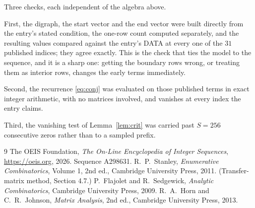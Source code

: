 \documentclass[11pt,a4paper]{article}
\theoremstyle{plain}
\theoremstyle{definition}
\begin{document}
Three checks, each independent of the algebra above.

First, the digraph, the start vector and the end vector were built directly from the
entry's stated condition, the one-row count computed separately, and the resulting values
compared against the entry's DATA at every one of the $31$ published indices; they
agree exactly. This is the check that ties the model to the sequence, and it is a sharp one:
getting the boundary rows wrong, or treating them as interior rows, changes the early terms
immediately.

Second, the recurrence \eqref{eq:conj} was evaluated on those published terms in exact
integer arithmetic, with no matrices involved, and vanishes at every index the entry claims.

Third, the vanishing test of Lemma~\ref{lem:crit} was carried past $S=256$ consecutive
zeros rather than to a sampled prefix.

\begin{thebibliography}{9}
 The OEIS Foundation, \emph{The On-Line Encyclopedia of Integer
Sequences}, \url{https://oeis.org}, 2026. Sequence A298631.
 R.~P.~Stanley, \emph{Enumerative Combinatorics}, Volume 1, 2nd ed.,
Cambridge University Press, 2011. (Transfer-matrix method, Section 4.7.)
 P.~Flajolet and R.~Sedgewick, \emph{Analytic Combinatorics}, Cambridge
University Press, 2009.
 R.~A.~Horn and C.~R.~Johnson, \emph{Matrix Analysis}, 2nd ed., Cambridge
University Press, 2013.
\end{thebibliography}
\end{document}
